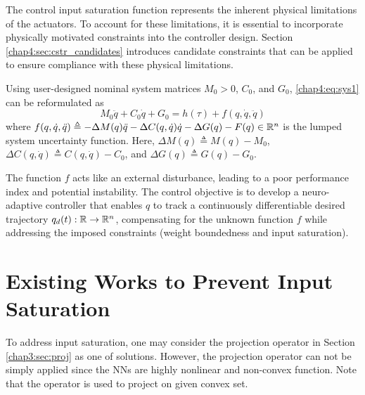 The control input saturation function represents the inherent physical limitations of the actuators. To account for these limitations, it is essential to incorporate physically motivated constraints into the controller design. Section \ref{chap4:sec:cstr_candidates} introduces candidate constraints that can be applied to ensure compliance with these physical limitations.

Using user-designed nominal system matrices $M_0 > 0$, $C_0$, and $G_0$, \eqref{chap4:eq:sys1} can be reformulated as
\begin{equation}
    M_0\ddot q+C_0\dot q+G_0 = h(\tau) + f(q,\dot q,\ddot q)
    \label{chap4:eq:sys2}
\end{equation}
where $f(q,\dot q,\ddot q) \triangleq -\Delta M(q)\ddot q-\Delta C(q,\dot q)\dot q -\Delta G(q) -F(q)\in\mathbb{R}^n$ is the lumped system uncertainty function. Here, $\Delta M(q)\triangleq M(q)-M_0$, $\Delta C(q,\dot q)\triangleq C(q,\dot q)-C_0$, and $\Delta G(q)\triangleq G(q)-G_0$. 

The function $f$ acts like an external disturbance, leading to a poor performance index and potential instability. 
The control objective is to develop a neuro-adaptive controller that enables $q$ to track a continuously differentiable desired trajectory ${q_d}(t): \mathbb{R} \to \mathbb{R}^n$, compensating for the unknown function $f$ while addressing the imposed constraints (\eg weight boundedness and input saturation).

\section{Existing Works to Prevent Input Saturation} 

To address input saturation, one may consider the projection operator in Section \ref{chap3:sec:proj} as one of solutions.
However, the projection operator can not be simply applied since the NNs are highly nonlinear and non-convex function.
Note that the operator is used to project on given convex set.

